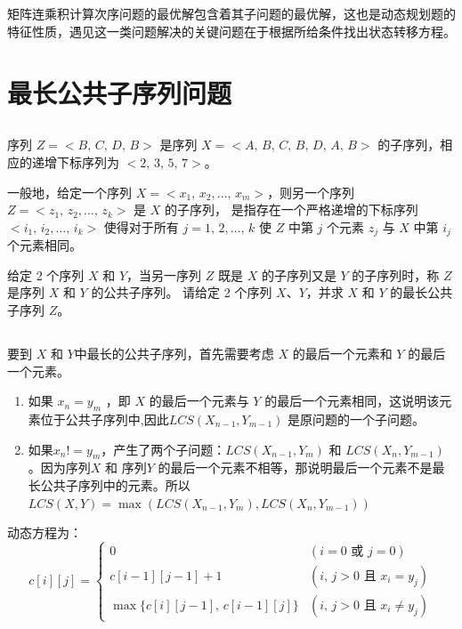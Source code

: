 \subsection*{}
矩阵连乘积计算次序问题的最优解包含着其子问题的最优解，这也是动态规划题的特征性质，遇见这一类问题解决的关键问题在于根据所给条件找出状态转移方程。

\newpage

\section{最长公共子序列问题}

\subsection*{}
序列 $Z=<B,\,C,\,D,\,B>$ 是序列 $X=<A,\,B,\,C,\,B,\,D,\,A,\,B>$ 的子序列，相应的递增下标序列为 $<2,\,3,\,5,\,7>$。


一般地，给定一个序列 $X=<x_1,\,x_2,\dots,\,x_m>$，则另一个序列 $Z=<z_1,\,z_2,\dots,\,z_k>$ 是 $X$ 的子序列，
是指存在一个严格递增的下标序列 $<i_1,\,i_2,\dots,\,i_k>$ 使得对于所有 $j=1,\,2,\dots,\,k$ 使 $Z$ 中第 $j$ 个元素 $z_j$ 与 $X$ 中第 $i_j$ 个元素相同。


给定 2 个序列 $X$ 和 $Y$，当另一序列 $Z$ 既是 $X$ 的子序列又是 $Y$ 的子序列时，称 $Z$ 是序列 $X$ 和 $Y$ 的公共子序列。
请给定 2 个序列 $X$、$Y$，并求 $X$ 和 $Y$ 的最长公共子序列 $Z$。


\subsection*{}
要到 $X$ 和 $Y$中最长的公共子序列，首先需要考虑 $X$ 的最后一个元素和 $Y$ 的最后一个元素。
\begin{enumerate}
    \item 如果 $x_n=y_m$ ，即 $X$ 的最后一个元素与 $Y$ 的最后一个元素相同，这说明该元素位于公共子序列中,因此$LCS(X_{n-1},Y_{m-1})$ 是原问题的一个子问题。
    \item  如果$x_n != y_m$，产生了两个子问题：$LCS(X_{n-1},Y_m)$ 和 $LCS(X_n,Y_{m-1})$。因为序列$X$ 和 序列$Y$ 的最后一个元素不相等，那说明最后一个元素不是最长公共子序列中的元素。所以$LCS(X,Y)=\max({LCS(X_{n-1},Y_m),LCS(X_n,Y_{m-1})})$
\end{enumerate}

动态方程为：
\[ c[i][j] = \left\{
\begin{array}{ll}
0 & (i=0\text{ 或 }j=0) \\
c[i-1][j-1]+1 & (i,\,j>0\text{ 且 }x_i=y_j) \\
\max\{c[i][j-1],\,c[i-1][j]\} & (i,\,j>0\text{ 且 }x_i\neq y_j)
\end{array} \right. \] 

